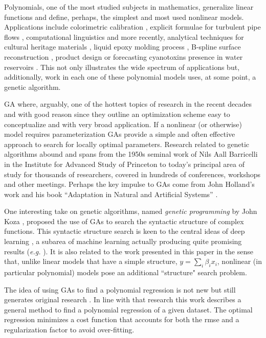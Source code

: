 \documentclass{elsarticle}
\begin{document}
Polynomials, one of the most studied subjects in mathematics, generalize li\-ne\-ar functions and define, perhaps, the simplest and most used nonlinear models. Applications include colorimetric calibration \cite{mendes2005adaptive}, explicit formulae for turbulent pipe flows \cite{davidson1999method}, computational linguistics \cite{sanchez2009obtaining} and more recently, analytical techniques for cultural heritage materials \cite{csefalvayova2010use}, liquid epoxy molding process \cite{chan2011modeling}, B-spline surface reconstruction \cite{galvez2012iterative}, product design \cite{chan2012development} or forecasting cyanotoxins presence in water reservoirs \cite{garcia2013hybrid}. This not only illustrates the wide spectrum of applications but, additionally, work in each one of these polynomial models uses, at some point, a genetic algorithm.

\ac{GA} where, arguably, one of the hottest topics of research in the recent decades and with good reason since they outline an optimization scheme easy to conceptualize and with very broad application. If a nonlinear (or otherwise) model requires parameterization \acp{GA} provide a simple and often effective approach to search for locally optimal parameters. Research related to genetic algorithms abound and spans from the 1950s seminal work of Nils Aall Barricelli \cite{barricelli1962numerical} in the Institute for Advanced Study of Princeton to today's principal area of study for thousands of researchers, covered in hundreds of conferences, workshops and other meetings. Perhaps the key impulse to \acp{GA} come from John Holland's work and his book ``Adaptation in Natural and Artificial Systems'' \cite{holland1975adaptation}.  

One interesting take on genetic algorithms, named \emph{genetic programming} by John Koza \cite{koza1992genetic}, proposed the use of \acp{GA} to search the syntactic structure of complex functions. This syntactic structure search is keen to the central ideas of deep learning \cite{bengio2013representation, bengio2009learning}, a subarea of machine learning actually producing quite promising results (\emph{e.g.} \cite{tarlowstochastic}). It is also related to the work presented in this paper in the sense that, unlike linear models that have a simple structure, $y=\sum_i \beta_i x_i$, nonlinear (in particular polynomial) models pose an additional ``structure" search problem.

The idea of using \acp{GA} to find a polynomial regression is not new \cite{maertens2006genetic, yu2008optimal, wu2009novel} but still generates original research \cite{hofwing2011optimal, cetisli2011polynomial}. In line with that research this work describes a general method to find a polynomial regression of a given dataset. The optimal regression minimizes a cost function that accounts for both the \ac{rmse} and a regularization factor to avoid over-fitting. 
\end{document}

